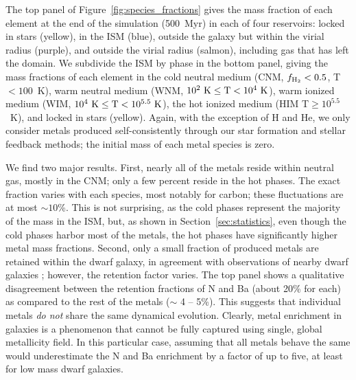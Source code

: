 \documentclass[twocolumn]{aastex61}
\begin{document}
The top panel of Figure~\ref{fig:species_fractions} gives the mass fraction of each element at the end of the simulation (500~Myr) in each of four reservoirs: locked in stars (yellow), in the ISM (blue), outside the galaxy but within the virial radius (purple), and outside the virial radius (salmon), including gas that has left the domain. We subdivide the ISM by phase in the bottom panel, giving the mass fractions of each element in the cold neutral medium (CNM, $f_{\rm H_2} < 0.5$,  T$< 100$~K), warm neutral medium (WNM, $10^2~\rm{K}\le \rm{T} < 10^4~\rm{K}$), warm ionized medium (WIM, $10^4~\rm{K}\le \rm{T} < 10^{5.5}~\rm{K}$), the hot ionized medium (HIM T$\ge 10^{5.5}$~K), and locked in stars (yellow). Again, with the exception of H and He, we only consider metals produced self-consistently through our star formation and stellar feedback methods; the initial mass of each metal species is zero.

We find two major results. First, nearly all of the metals reside within neutral gas, mostly in the CNM; only a few percent reside in the hot phases. The exact fraction varies with each species, most notably for carbon; these fluctuations are at most $\sim 10$\%. This is not surprising, as the cold phases represent the majority of the mass in the ISM, but, as shown in Section~\ref{sec:statistics}, even though the cold phases harbor most of the metals, the hot phases have significantly higher metal mass fractions. Second, only a small fraction of produced metals are retained within the dwarf galaxy, in agreement with observations of nearby dwarf galaxies \citep[see][]{Kirby2011-metals, McQuinn2015}; however, the retention factor varies. The top panel shows a qualitative disagreement between the retention fractions of N and Ba (about 20\% for each) as compared to the rest of the metals ($\sim$ 4 -- 5\%). This suggests that individual metals \textit{do not} share the same dynamical evolution. Clearly, metal enrichment in galaxies is a phenomenon that cannot be fully captured using single, global metallicity field. In this particular case, assuming that all metals behave the same would underestimate the N and Ba enrichment by a factor of up to five, at least for low mass dwarf galaxies.
\end{document}
